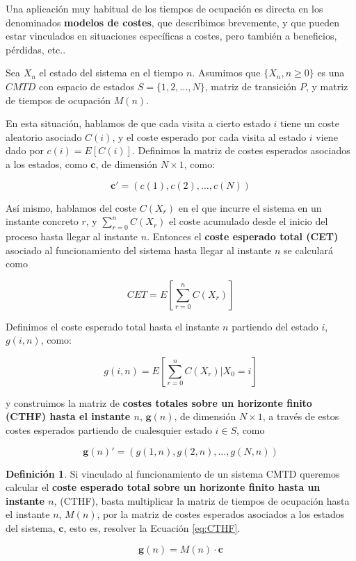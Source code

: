 \documentclass[
]{book}
\newenvironment{yellowbox}{
  \definecolor{shadecolor}{rgb}{210, 180, 140}  
  \color{black}
  \begin{shaded}}
 {\end{shaded}}
\theoremstyle{definition}
\newtheorem{definition}{Definición}[chapter]
\theoremstyle{definition}
\theoremstyle{definition}
\theoremstyle{definition}
\theoremstyle{remark}
\begin{document}
Una aplicación muy habitual de los tiempos de ocupación es directa en los denominados \textbf{modelos de costes}, que describimos brevemente, y que pueden estar vinculados en situaciones específicas a costes, pero también a beneficios, pérdidas, etc..

Sea \(X_n\) el estado del sistema en el tiempo \(n\). Asumimos que \(\{X_n, n \geq 0 \}\) es una \(CMTD\) con espacio de estados \(S =\{1, 2,...,N\}\), matriz de transición \(P\), y matriz de tiempos de ocupación \(M(n)\).

En esta situación, hablamos de que cada visita a cierto estado \(i\) tiene un coste aleatorio asociado \(C(i)\), y el coste esperado por cada visita al estado \(i\) viene dado por \(c(i) = E[C(i)]\). Definimos la matriz de costes esperados asociados a los estados, como \(\mathbf{c}\), de dimensión \(N\times 1\), como:

\[\mathbf{c}' = (c(1),c(2),\ldots,c(N))\]

Así mismo, hablamos del coste \(C(X_r)\) en el que incurre el sistema en un instante concreto \(r\), y \(\sum_{r=0}^n C(X_r)\) el coste acumulado desde el inicio del proceso hasta llegar al instante \(n\). Entonces el \textbf{coste esperado total (CET)} asociado al funcionamiento del sistema hasta llegar al instante \(n\) se calculará como

\[CET=E\left[\sum_{r=0}^n C(X_r)\right]\]

Definimos el coste esperado total hasta el instante \(n\) partiendo del estado \(i\), \(g(i,n)\), como:

\[g(i,n) = E\left[\sum_{r=0}^n C(X_r)| X_0 = i \right]\]

y construimos la matriz de \textbf{costes totales sobre un horizonte finito (CTHF) hasta el instante \(n\)}, \(\mathbf{g}(n)\), de dimensión \(N \times 1\), a través de estos costes esperados partiendo de cualesquier estado \(i \in S\), como

\[\mathbf{g}(n)' = (g(1,n),g(2,n),\ldots,g(N,n))\]

\begin{yellowbox}

\begin{definition}

Si vinculado al funcionamiento de un sistema CMTD queremos calcular el \textbf{coste esperado total sobre un horizonte finito hasta un instante \(n\)}, (CTHF), basta multiplicar la matriz de tiempos de ocupación hasta el instante \(n\), \(M(n)\), por la matriz de costes esperados asociados a los estados del sistema, \(\mathbf{c}\), esto es, resolver la Ecuación \eqref{eq:CTHF}.

\begin{equation}
\mathbf{g}(n) = M(n) \cdot \mathbf{c}
\label{eq:CTHF}
\end{equation}

\end{definition}

\end{yellowbox}
\end{document}
